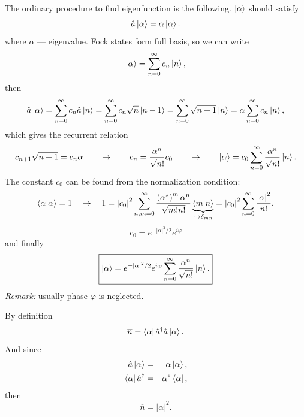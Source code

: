 The ordinary procedure to find eigenfunction is the following. $\left\lvert {\alpha} \right\rangle$ should satisfy
\begin{equation}
	\hat{a} \left\lvert {\alpha} \right\rangle = \alpha \left\lvert {\alpha} \right\rangle.
\end{equation}
where $\alpha$ --- eigenvalue.
Fock states form full basis, so we can write
\begin{equation}
	\left\lvert {\alpha} \right\rangle = \sum_{n=0}^{\infty} c_n \left\lvert {n} \right\rangle,
\end{equation}
then
\begin{equation}
	\hat{a} \left\lvert {\alpha} \right\rangle = \sum_{n=0}^{\infty} c_n \hat{a} \left\lvert {n} \right\rangle = \sum_{n=0}^{\infty} c_n \sqrt{n} \left\lvert {n-1} \right\rangle = \sum_{n=0}^{\infty} \sqrt{n+1} \left\lvert {n} \right\rangle = \alpha \sum_{n=0}^{\infty} c_n \left\lvert {n} \right\rangle,
\end{equation}
which gives the recurrent relation
\begin{equation}
	c_{n+1} \sqrt{n+1} = c_n \alpha \qquad \to \qquad c_n = \frac{\alpha^n}{\sqrt{n!}} c_0 \qquad \to \qquad \left\lvert {\alpha} \right\rangle = c_0 \sum_{n=0}^{\infty} \frac{\alpha^n}{\sqrt{n!}} \left\lvert {n} \right\rangle.
\end{equation}
The constant $c_0$ can be found from the normalization condition:
\begin{equation}
	\langle {\alpha} \lvert {\alpha} \rangle = 1 \quad \to \quad 1 = \left|c_0\right|^2 \sum_{n,m = 0}^{\infty} \frac{\left( \alpha^* \right)^m \alpha^n}{\sqrt{m!n!}} \underbrace{\langle {m} \lvert {n} \rangle}_{\hookrightarrow  \delta_{mn}} = \left|c_0\right|^2 \sum_{n = 0}^{\infty} \frac{\left|\alpha\right|^2}{n!},
\end{equation}
\begin{equation}
	c_0 = e^{- \left|\alpha\right|^2/2} e^{i \varphi}
\end{equation}
and finally
\begin{equation}
	\boxed{\left\lvert {\alpha} \right\rangle = e^{- \left|\alpha\right|^2/2} e^{i \varphi} \sum_{n = 0}^{\infty} \frac{\alpha^n}{\sqrt{n!}} \left\lvert {n} \right\rangle.}
\end{equation}
\textit{Remark:} usually phase $\varphi$ is neglected.

\begin{testexample}
	By definition
	\begin{equation}
	\overline{n} = \left\langle {\alpha} \right\rvert \hat{a}^{\dagger} \hat{a} \left\lvert {\alpha} \right\rangle.
	\end{equation}
	And since
	\begin{eqnarray}
	\hat{a} \left\lvert {\alpha} \right\rangle &=& \alpha \left\lvert {\alpha} \right\rangle, \\
	\left\langle {\alpha} \right\rvert \hat{a}^{\dagger}  &=& \alpha^* \left\langle {\alpha} \right\rvert,
	\end{eqnarray}
	then
	\begin{equation}
	\overline{n} = \left| \alpha \right|^2.
	\end{equation}
\end{testexample}

